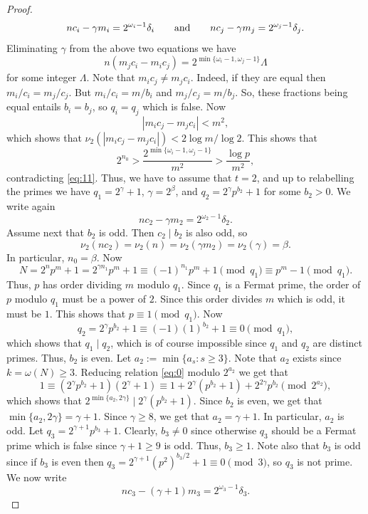 \documentclass[11pt]{article}
\begin{document}
\begin{proof}
$$
nc_i-\gamma m_i=2^{\omega_i-1}\delta_i\qquad {\text{\rm and}}\qquad nc_j-\gamma m_j=2^{\omega_j-1}\delta_j.
$$
Eliminating $\gamma$ from the above two equations we have 
$$
n(m_jc_i-m_ic_j)=2^{\min\{\omega_i-1,\omega_j-1\}}\Lambda
$$
for some integer $\Lambda$. Note that $m_ic_j\ne m_jc_i$. Indeed, if they are equal then $m_i/c_i=m_j/c_j$. But $m_i/c_i=m/b_i$ and $m_j/c_j=m/b_j$. So, these fractions being equal entails $b_i=b_j$, so $q_i=q_j$ 
which is false. Now 
$$
|m_ic_j-m_jc_i|<m^2,
$$
which shows that $\nu_2(|m_ic_j-m_jc_i|)<2\log m/\log 2$. This shows that 
$$
2^{n_0}> \frac{2^{\min\{\omega_i-1,\omega_j-1\}}}{m^2}>\frac{\log p}{m^2},
$$
contradicting \eqref{eq:11}. Thus, we have to assume that $t=2$, and up to relabelling the primes we have $q_1=2^{\gamma}+1$, $\gamma=2^{\beta}$, and $q_2=2^{\gamma}p^{b_2}+1$ for some $b_2>0$. We write again 
\begin{equation}
\label{eq:12}
nc_2-\gamma m_2=2^{\omega_2-1}\delta_2.
\end{equation}
Assume next that $b_2$ is odd. Then $c_2\mid b_2$ is also odd, so 
$$
\nu_2(nc_2)=\nu_2(n)=\nu_2(\gamma m_2)=\nu_2(\gamma)=\beta.
$$ 
In particular, $n_0=\beta$. Now 
$$
N=2^np^m+1=2^{\gamma n_1} p^m+1\equiv (-1)^{n_1} p^m+1\pmod {q_1}\equiv p^m-1\pmod {q_1}.
$$
Thus, $p$ has order dividing $m$ modulo $q_1$. Since $q_1$ is a Fermat prime, the order of $p$ modulo $q_1$ must be a power of $2$. Since this order divides $m$ which is odd, it must be $1$. This shows that $p\equiv 1\pmod {q_1}$. Now 
$$
q_2=2^{\gamma}p^{b_2}+1\equiv (-1) (1)^{b_2}+1\equiv 0\pmod {q_1},
$$
which shows that $q_1\mid q_2$, which is of course impossible since $q_1$ and $q_2$ are distinct primes. Thus, $b_2$ is even. Let $a_2:=\min\{a_{s}: s\ge 3\}$. Note that $a_2$ exists since 
$k=\omega(N)\ge 3$. Reducing relation \eqref{eq:0} modulo $2^{a_2}$ we get that
$$
1\equiv (2^{\gamma}p^{b_2}+1)(2^{\gamma}+1)\equiv 1+2^{\gamma}(p^{b_2}+1)+2^{2\gamma}p^{b_2}\pmod {2^{a_2}},
$$
which shows that $2^{\min\{a_2,2\gamma\}}\mid 2^{\gamma}(p^{b_2}+1)$. Since $b_2$ is even, we get that $\min\{a_2,2\gamma\}=\gamma+1$. Since $\gamma\ge 8$, we get that $a_2=\gamma+1$. In particular, 
$a_2$ is odd. Let $q_3=2^{\gamma+1}p^{b_3}+1$. Clearly, $b_3\ne 0$ since otherwise $q_3$ should be a Fermat prime which is false since $\gamma+1\ge 9$ is odd. Thus, $b_3\ge 1$. Note also that $b_3$ is odd since
if $b_3$ is even then $q_3=2^{\gamma+1}(p^2)^{b_3/2}+1\equiv 0\pmod 3$, so $q_3$ is not prime. We now write 
\begin{equation}
\label{eq:13}
nc_3-(\gamma+1)m_3=2^{\omega_3-1}\delta_3.

\end{equation}
\end{proof}
\end{document}
